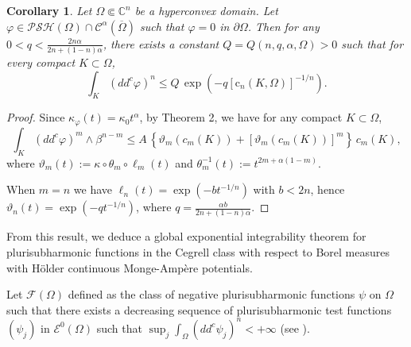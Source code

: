 \documentclass[12pt]{amsart}
\newtheorem{corollary}[theorem]{Corollary}
\theoremstyle{definition}
\numberwithin{theorem}{section}
\numberwithin{equation}{section}
\newcommand{\C}{\mathbb{C}}
\begin{document}
{\begin{corollary}  \label{cor:MongeAmpereMass} Let $\Omega \Subset \C^n$ be a hyperconvex  domain.
 Let $\varphi\in \mathcal{PSH} (\Omega)\cap \mathcal{C}^{\alpha} (\overline\Omega)$ such that $\varphi = 0$ in $\partial \Omega$.  Then for any $0 < q <  \frac{ 2 n \alpha}{  2 n+  (1 - n) \alpha}$, there exists a constant $ Q = Q (n,q,\alpha,\Omega)>0$ such that for every compact $K\subset\Omega$, 
$$
\int_ K (dd^c\varphi)^n \leq Q \, \exp \left( - q \left[\text{c}_n (K,\Omega)\right]^{- 1 \slash n}\right).
$$ 
\end{corollary}
\begin{proof} Since $\kappa_\varphi (t) = \kappa_0 t^{\alpha}$, by Theorem 2, we have for any compact $K \subset \Omega$,
$$
\int_{K}(dd^c\varphi)^m\wedge\beta^{n-m}  \leq  A  \, \left\{\vartheta_m  (c_m (K)) + \left[\vartheta_m  (c_m (K))\right]^m\right\} \, c_m (K),
$$
where
$\vartheta_m (t) := \kappa \circ \theta_m \circ \ell_m (t)$ and $\theta_m^{-1} (t) := t^{2 m+ \alpha(1 - m)}$. 

When $m = n$ we have $\ell_n (t) = \exp (-b t^{-1 \slash n})$ with $b < 2 n$, hence $\vartheta_n (t) = \exp (- q  t^{-1 \slash n})$, where $q = \frac{\alpha b}{ 2 n+  (1 - n) \alpha}$.
\end{proof}

From this result, we deduce a global exponential  integrability theorem for plurisubharmonic functions in the Cegrell class with respect to Borel measures with  H\"older continuous Monge-Amp\`ere potentials. 

Let $\mathcal{F} (\Omega)$ defined as the class of negative plurisubharmonic functions $\psi$ on $\Omega$ such that there exists a decreasing sequence  of plurisubharmonic test functions  $(\psi_j)$ in $\mathcal{E}^0 (\Omega)$ such that $\sup_j \int_{\Omega} (dd^c \psi_j)^n < + \infty$ (see \cite{Ceg04}).

}
\end{document}
